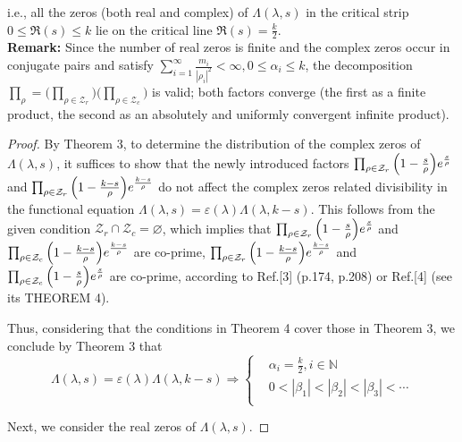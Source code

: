 \documentclass[12pt]{article}
\begin{document}
i.e., all the zeros (both real and  complex) of $\Lambda(\lambda, s)$ in the critical strip $0 \leq \Re(s) \leq k$ lie on the critical line $\Re(s)=\frac{k}{2}$.\\

\textbf{Remark:} Since the number of real zeros is finite and the complex zeros occur in conjugate pairs and satisfy $\sum_{i=1}^{\infty} \frac{m_i}{|\rho_i|^2}<\infty, 0 \leq \alpha_i \leq k$, the decomposition
$\prod_{\rho}=\bigl(\prod_{\rho\in\mathcal{Z}_r}\bigr)\bigl(\prod_{\rho\in\mathcal{Z}_c}\bigr)$ is valid; both factors converge (the first as a finite product, the second as an absolutely and uniformly convergent infinite product).\\



\begin{proof}

By Theorem 3, to determine the distribution of the complex zeros of $\Lambda(\lambda, s)$, it suffices to show that the newly introduced factors $\prod_{\rho \in \mathcal{Z}_{r}}\Big{(}1-\frac{s}{\rho}\Big{)}e^{\frac{s}{\rho}}$  and $\prod_{\rho \in \mathcal{Z}_{r}}\Big{(}1-\frac{k-s}{\rho}\Big{)}e^{\frac{k-s}{\rho}}$ do not affect the complex zeros related divisibility in the functional equation $\Lambda(\lambda, s)=\varepsilon(\lambda)\Lambda(\lambda, k-s)$. This follows from the given condition $\mathcal{Z}_{r} \cap \mathcal{Z}_{c} = \varnothing$, which implies that $\prod_{\rho \in \mathcal{Z}_{r}}\Big{(}1-\frac{s}{\rho}\Big{)}e^{\frac{s}{\rho}}$ and $\prod_{\rho \in \mathcal{Z}_{c}}\Big{(}1-\frac{k-s}{\rho}\Big{)}e^{\frac{k-s}{\rho}}$ are co-prime, $\prod_{\rho \in \mathcal{Z}_{r}}\Big{(}1-\frac{k-s}{\rho}\Big{)}e^{\frac{k-s}{\rho}}$ and $\prod_{\rho \in \mathcal{Z}_{c}}\Big{(}1-\frac{s}{\rho}\Big{)}e^{\frac{s}{\rho}}$ are co-prime, according to Ref.[3] (p.174, p.208) or Ref.[4] (see its THEOREM 4).

Thus, considering that the conditions in Theorem 4 cover those in Theorem 3, we conclude by Theorem 3 that
\begin{equation}
 \Lambda(\lambda, s)=\varepsilon(\lambda)\Lambda(\lambda, k-s)\Rightarrow\begin{cases}&\alpha_i=\frac{k}{2}, i\in\mathbb{N}\\ & 0<|\beta_1|<|\beta_2|<|\beta_3|< \cdots\\
  \end{cases}
\end{equation}

Next, we consider the real zeros of $\Lambda(\lambda, s)$.


\end{proof}
\end{document}
